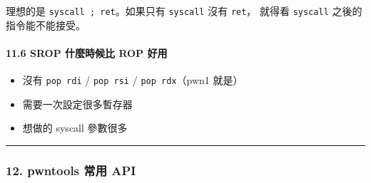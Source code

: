 \documentclass[10pt,a4paper]{article}
\providecommand{\tightlist}{%
  \setlength{\itemsep}{0pt}\setlength{\parskip}{0pt}}
\begin{document}
理想的是 \texttt{syscall\ \allowbreak{};\ \allowbreak{}ret}。如果只有 \texttt{syscall} 沒有
\texttt{ret}， 就得看 \texttt{syscall} 之後的指令能不能接受。

\paragraph{11.6 SROP 什麼時候比 ROP
好用}\label{srop-ux4ec0ux9ebcux6642ux5019ux6bd4-rop-ux597dux7528}

\begin{itemize}
\tightlist
\item
  沒有 \texttt{pop\ \allowbreak{}rdi} / \texttt{pop\ \allowbreak{}rsi} / \texttt{pop\ \allowbreak{}rdx}（pwn1
  就是）
\item
  需要一次設定很多暫存器
\item
  想做的 syscall 參數很多
\end{itemize}

\begin{center}\rule{0.5\linewidth}{0.5pt}\end{center}

\subsubsection{12. pwntools 常用 API}\label{pwntools-ux5e38ux7528-api}
\end{document}
